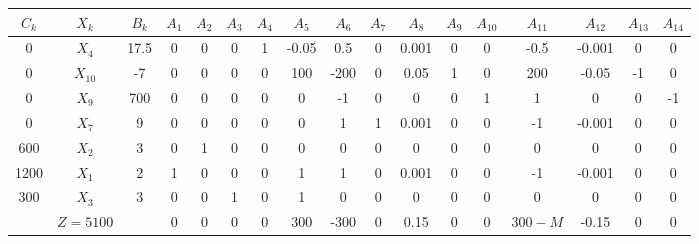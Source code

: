 \begin{tabular}{ccccccccccccccccc}
$C_k$  & $X_k$  & $B_k$  & $A_1$  & $A_2$  & $A_3$  & $A_4$  & $A_5$  & $A_6$  & $A_7$  & $A_8$  & $A_9$  & $A_{10}$ & $A_{11}$ & $A_{12}$ & $A_{13}$ & $A_{14}$ \bigstrut[b]\\
\hline
\hline
0      & $X_4$  & 17.5   & 0      & 0      & 0      & 1      & -0.05  & 0.5    & 0      & 0.001  & 0      & 0      & -0.5   & -0.001 & 0      & 0 \bigstrut[t]\\
0      & $X_{10}$ & -7     & 0      & 0      & 0      & 0      & 100    & -200   & 0      & 0.05   & 1      & 0      & 200    & -0.05  & -1     & 0 \\
0      & $X_9$  & 700    & 0      & 0      & 0      & 0      & 0      & -1     & 0      & 0      & 0      & 1      & 1      & 0      & 0      & -1 \\
0      & $X_7$  & 9      & 0      & 0      & 0      & 0      & 0      & 1      & 1      & 0.001  & 0      & 0      & -1     & -0.001 & 0      & 0 \\
600    & $X_2$  & 3      & 0      & 1      & 0      & 0      & 0      & 0      & 0      & 0      & 0      & 0      & 0      & 0      & 0      & 0 \\
1200   & $X_1$  & 2      & 1      & 0      & 0      & 0      & 1      & 1      & 0      & 0.001  & 0      & 0      & -1     & -0.001 & 0      & 0 \\
300    & $X_3$  & 3      & 0      & 0      & 1      & 0      & 1      & 0      & 0      & 0      & 0      & 0      & 0      & 0      & 0      & 0 \bigstrut[b]\\
\hline
       & $Z=5100$ &        & 0      & 0      & 0      & 0      & 300    & -300   & 0      & 0.15   & 0      & 0      & $300-M$ & -0.15  & 0      & 0 \bigstrut\\
\hline
\hline
\end{tabular}%
